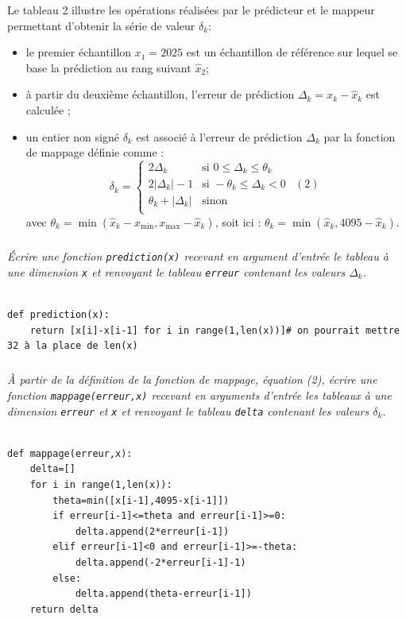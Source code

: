 \documentclass[10pt,fleqn]{article} %
\begin{document}
Le tableau 2 illustre les opérations réalisées par le prédicteur et le mappeur permettant d’obtenir la série
de valeur $\delta_k$:
\begin{itemize}
\item le premier échantillon $x_1 = 2 025$ est un échantillon de référence sur lequel se base la prédiction au rang
suivant $\hat{x}_2$;
\item à partir du deuxième échantillon, l’erreur de prédiction $\Delta_k = x_k - \hat{x}_k$ est calculée ;
\item un entier non signé $\delta_k$ est associé à l’erreur de prédiction $\Delta_k$ par la fonction de mappage
définie comme :
$$
\delta_k = \left\{
\begin{array}{llr}
2\Delta_k & \text{si } 0\leq \Delta_k \leq \theta_k & \\
2\left|\Delta_k \right| - 1& \text{si } -\theta_k \leq \Delta_k <0 & (2)\\
\theta_k + \left|\Delta_k \right|  & \text{sinon } & \\
\end{array}
\right.
$$
avec $\theta_k= \min\left( \hat{x}_k - x_{\text{min}}, x_{\text{max}} -\hat{x}_k \right)$, soit ici :
$\theta_k=\min \left( \hat{x}_k, 4095 - \hat{x}_k\right)$.
\end{itemize}
\fi




\subparagraph{}\textit{Écrire une fonction \texttt{prediction(x)} recevant en argument d’entrée le tableau à une dimension \texttt{x} et renvoyant le tableau \texttt{erreur} contenant les valeurs $\Delta_k$.}
\ifprof
\begin{corrige}

\begin{lstlisting}

def prediction(x):
    return [x[i]-x[i-1] for i in range(1,len(x))]# on pourrait mettre 32 à la place de len(x)
\end{lstlisting}
\end{corrige}
\else
\fi

\subparagraph{}\textit{À partir de la définition de la fonction de mappage, équation (2), écrire une fonction
\texttt{mappage(erreur,x)} recevant en arguments d’entrée les tableaux à une dimension \texttt{erreur} et \texttt{x}
et renvoyant le tableau \texttt{delta} contenant les valeurs $\delta_k$.}
\ifprof
\begin{corrige}
\begin{lstlisting}

def mappage(erreur,x):
    delta=[]
    for i in range(1,len(x)):
        theta=min([x[i-1],4095-x[i-1]])
        if erreur[i-1]<=theta and erreur[i-1]>=0:
            delta.append(2*erreur[i-1])
        elif erreur[i-1]<0 and erreur[i-1]>=-theta:
            delta.append(-2*erreur[i-1]-1)
        else:
            delta.append(theta-erreur[i-1])
    return delta
\end{lstlisting}
\end{corrige}
\else
\fi
\end{document}
